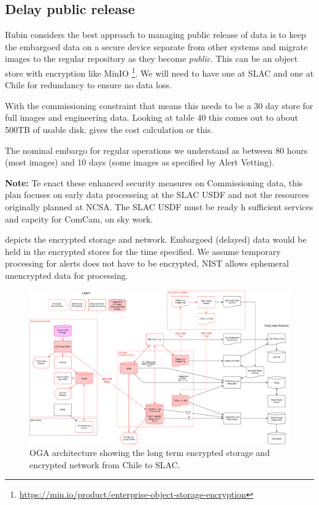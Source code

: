 
\subsection{Delay public release} \label{sec:3delay}

Rubin considers the best approach to managing public release of data is to keep the embargoed data on a secure device separate from other systems and migrate images to the regular repository as they become \emph{public}.
This can be an object store with encryption like MinIO \footnote{\url{ https://min.io/product/enterprise-object-storage-encryption}}.
We will need to have one at SLAC and one at Chile for redundancy to ensure no data loss.

With the commissioning constraint that means this needs to be a 30 day store  for full images and engineering data.
Looking at 
table 40 this comes out to about 500TB of usable disk.
 gives the cost calculation or this.

The nominal embargo for regular operations we understand as between 80 hours (most images) and 10 days (some images as specified by Alert Vetting).




{\bf Note:} Te enact these enhanced security measures on Commissioning data, this plan focuses on early data processeing at the SLAC USDF and not the resources originally planned at NCSA. The SLAC USDF must be ready h sufficient services and capcity for ComCam, on sky work.

 depicts the encrypted storage and network. Embargoed (delayed) data would be held in the encrypted stores for the time specified.
We assume temporary processing for alerts does not have to be encrypted, NIST allows ephemeral unencrypted data for processing.

\begin{figure}
\begin{centering}
\includegraphics[width=\textwidth]{OGA_Diagram}
	\caption{ OGA architecture  showing the long term encrypted storage and encrypted network from Chile to SLAC. \label{fig:arch}}
\end{centering}
\end{figure}
